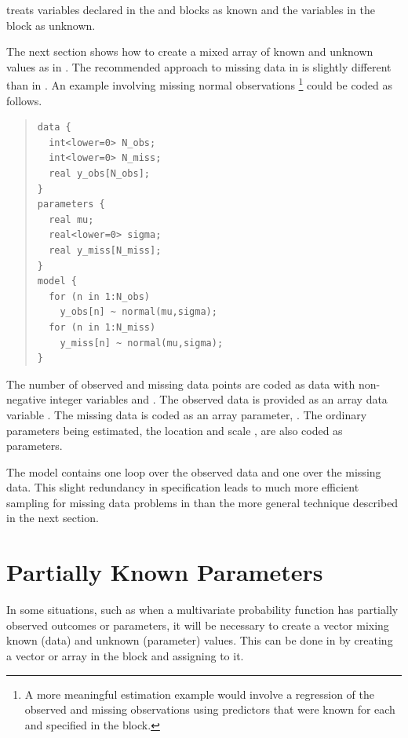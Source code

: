 \Stan treats variables declared in the  and
 blocks as known and the variables in the
 block as unknown.

The next section shows how to create a mixed array of known and
unknown values as in \BUGS.  The recommended approach to missing data
in \Stan is slightly different than in \BUGS.  An example involving
missing normal observations%
%
\footnote{A more meaningful estimation example would involve a
  regression of the observed and missing observations using predictors
  that were known for each and specified in the  block.}
%
could be coded as follows.
%
\begin{quote}
\begin{Verbatim}
data {
  int<lower=0> N_obs;
  int<lower=0> N_miss;
  real y_obs[N_obs];
}
parameters {
  real mu;
  real<lower=0> sigma;
  real y_miss[N_miss];
}
model {
  for (n in 1:N_obs)
    y_obs[n] ~ normal(mu,sigma);
  for (n in 1:N_miss)
    y_miss[n] ~ normal(mu,sigma);
}
\end{Verbatim}
\end{quote}
%
The number of observed and missing data points are coded as data with
non-negative integer variables  and .  The
observed data is provided as an array data variable .
The missing data is coded as an array parameter, .  The
ordinary parameters being estimated, the location  and scale
, are also coded as parameters.

The model contains one loop over the observed data and one over the
missing data.  This slight redundancy in specification leads to much
more efficient sampling for missing data problems in \Stan than the
more general technique described in the next section.


\section{Partially Known Parameters}\label{partially-known-parameters.section}

In some situations, such as when a multivariate probability function
has partially observed outcomes or parameters, it will be necessary to
create a vector mixing known (data) and unknown (parameter) values.
This can be done in \Stan by creating a vector or array in the
 block and assigning to it.

